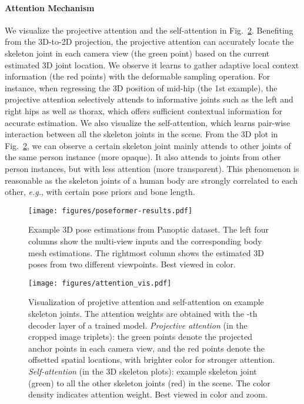 \documentclass{article}
\newcommand{\eg}{\emph{e.g.}}
\begin{document}
\paragraph{Attention Mechanism} 
We visualize the projective attention and the self-attention in Fig.~\ref{fig:exp_vis_attention}. Benefiting from the 3D-to-2D projection, the projective attention can accurately locate the skeleton joint in each camera view (the green point) based on the current estimated 3D joint location. We observe it learns to gather adaptive local context information (the red points) with the deformable sampling operation. For instance, when regressing the 3D position of mid-hip (the 1st example), the projective attention selectively attends to informative joints such as the left and right hips as well as thorax, which offers sufficient contextual information 
for   accurate estimation. We also visualize the self-attention, which learns pair-wise interaction between all the skeleton joints in the scene. From the 3D plot in Fig.~\ref{fig:exp_vis_attention}, we can observe a certain skeleton joint mainly attends to other joints of the same person instance (more opaque). It also attends to joints from other person instances, but with less attention (more transparent). This phenomenon is reasonable as the skeleton joints of a human body are strongly correlated to each other, \eg, with certain pose priors and bone length.


\begin{figure}[t]
	\centering
	\texttt{[image: figures/poseformer-results.pdf]}
\caption{
    Example 3D pose estimations from Panoptic dataset. The left four columns show the multi-view inputs and the corresponding body mesh estimations. The rightmost column shows the estimated 3D poses from two different viewpoints.
    Best viewed in color. 
}
	\label{fig:exp_vis}
\end{figure}


\begin{figure}[t]
	\centering
	\texttt{[image: figures/attention\_vis.pdf]}
\caption{Visualization of projetive attention   and self-attention   on example skeleton joints. The attention weights are obtained with the -th decoder layer of a trained model. 
	\textit{Projective attention} (in the cropped image triplets):  the green points denote the projected anchor points in each camera view, and the red points denote the offsetted spatial locations, with brighter color for stronger attention. 
	\textit{Self-attention} (in the 3D skeleton plots):   example skeleton joint (green) to all the other skeleton joints (red) in the scene. The color density indicates attention weight. Best viewed in color and  zoom.}
	\label{fig:exp_vis_attention}
\end{figure}
\end{document}
